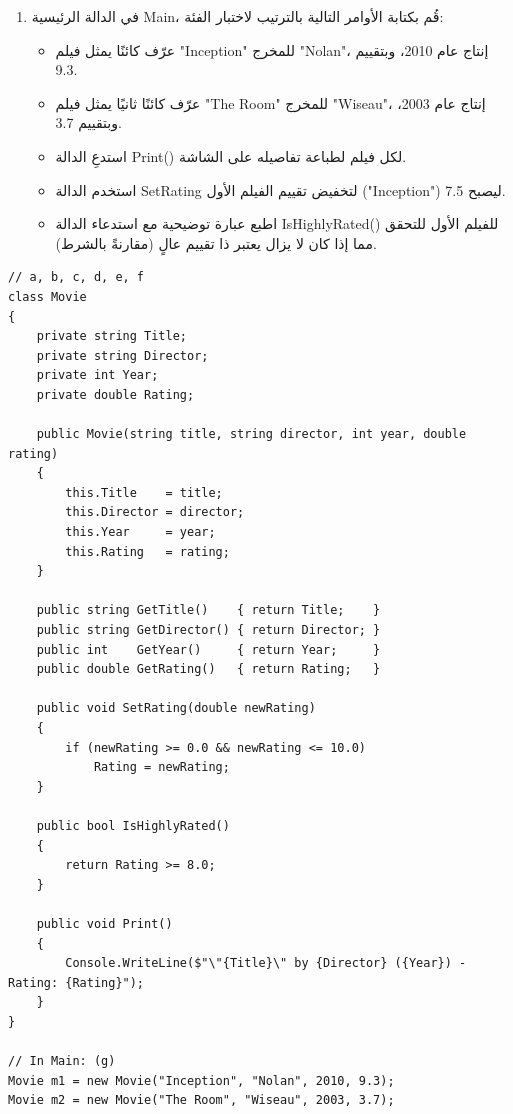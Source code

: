 \documentclass[14pt]{extarticle}
\begin{document}
\begin{enumerate}[itemsep=2em]
\begin{enumerate}[itemsep=1em]
    \item في الدالة الرئيسية \textenglish{Main}، قُم بكتابة الأوامر التالية بالترتيب لاختبار الفئة:
    \begin{itemize}[itemsep=1pt]
        \item عرّف كائنًا يمثل فيلم \textenglish{"Inception"} للمخرج \textenglish{"Nolan"}، إنتاج عام \textenglish{2010}، وبتقييم \textenglish{9.3}.
        \item عرّف كائنًا ثانيًا يمثل فيلم \textenglish{"The Room"} للمخرج \textenglish{"Wiseau"}، إنتاج عام \textenglish{2003}، وبتقييم \textenglish{3.7}.
        \item استدعِ الدالة \textenglish{Print()} لكل فيلم لطباعة تفاصيله على الشاشة.
        \item استخدم الدالة \textenglish{SetRating} لتخفيض تقييم الفيلم الأول (\textenglish{"Inception"}) ليصبح \textenglish{7.5}.
        \item اطبع عبارة توضيحية مع استدعاء الدالة \textenglish{IsHighlyRated()} للفيلم الأول للتحقق مما إذا كان لا يزال يعتبر ذا تقييم عالٍ (مقارنةً بالشرط).
    \end{itemize}
\end{enumerate}

\ifwithsols
\begin{boxSolution}
\begin{english}
\begin{verbatim}
// a, b, c, d, e, f
class Movie
{
    private string Title;
    private string Director;
    private int Year;
    private double Rating;

    public Movie(string title, string director, int year, double rating)
    {
        this.Title    = title;
        this.Director = director;
        this.Year     = year;
        this.Rating   = rating;
    }

    public string GetTitle()    { return Title;    }
    public string GetDirector() { return Director; }
    public int    GetYear()     { return Year;     }
    public double GetRating()   { return Rating;   }

    public void SetRating(double newRating)
    {
        if (newRating >= 0.0 && newRating <= 10.0)
            Rating = newRating;
    }

    public bool IsHighlyRated()
    {
        return Rating >= 8.0;
    }

    public void Print()
    {
        Console.WriteLine($"\"{Title}\" by {Director} ({Year}) - Rating: {Rating}");
    }
}

// In Main: (g)
Movie m1 = new Movie("Inception", "Nolan", 2010, 9.3);
Movie m2 = new Movie("The Room", "Wiseau", 2003, 3.7);


\end{verbatim}
\end{english}
\end{boxSolution}
\end{enumerate}
\end{document}
